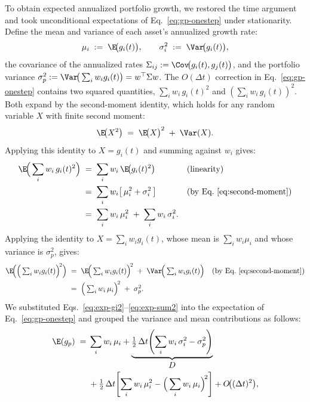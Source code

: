 To obtain expected annualized portfolio growth, we restored the time
argument and took unconditional expectations of
Eq.~\eqref{eq:gp-onestep} under stationarity. Define the mean and
variance of each asset's annualized growth rate:
\begin{equation}
  \mu_i \;:=\; \E\!\big(g_i(t)\big), \qquad
  \sigma_i^2 \;:=\; \Var\!\big(g_i(t)\big),
\end{equation}
the covariance of the annualized rates
$\Sigma_{ij} := \Cov\!\big(g_i(t), g_j(t)\big)$, and the portfolio
variance
$\sigma_p^2 := \Var\!\big(\textstyle\sum_i w_i g_i(t)\big) =
w^\top \Sigma w$. The $O(\Delta t)$ correction in
Eq.~\eqref{eq:gp-onestep} contains two squared quantities,
$\sum_i w_i\, g_i(t)^2$ and $(\sum_i w_i\, g_i(t))^2$. Both expand
by the second-moment identity, which holds for any random variable
$X$ with finite second moment:
\begin{equation}
  \E\!\big(X^2\big) \;=\; \E\!\big(X\big)^2 \;+\; \Var(X).
  \label{eq:second-moment}
\end{equation}
Applying this identity to $X = g_i(t)$ and summing against $w_i$ gives:
\begin{align}
  \E\!\Big(\sum_{i} w_i\, g_i(t)^2\Big)
   &\;=\; \sum_{i} w_i\, \E\!\big(g_i(t)^2\big)
       && \text{(linearity)} \notag \\
   &\;=\; \sum_{i} w_i\!\left[\,\mu_i^2 + \sigma_i^2\,\right]
       && \text{(by Eq.~\eqref{eq:second-moment})} \notag \\
   &\;=\; \sum_{i} w_i\, \mu_i^2 \;+\; \sum_{i} w_i\, \sigma_i^2.
   \label{eq:exp-gi2}
\end{align}
Applying the identity to $X = \sum_i w_i g_i(t)$, whose mean is
$\sum_i w_i\mu_i$ and whose variance is $\sigma_p^2$, gives:
\begin{align}
  \E\!\Big(\Big(\textstyle\sum_{i} w_i g_i(t)\Big)^{\!2}\Big)
   &\;=\; \E\!\Big(\textstyle\sum_{i} w_i g_i(t)\Big)^{\!2}
       \;+\; \Var\!\Big(\textstyle\sum_{i} w_i g_i(t)\Big)
       && \text{(by Eq.~\eqref{eq:second-moment})} \notag \\
   &\;=\; \Big(\textstyle\sum_{i} w_i\, \mu_i\Big)^{\!2}
       \;+\; \sigma_p^2.
   \label{eq:exp-sum2}
\end{align}
We substituted Eqs.~\eqref{eq:exp-gi2}--\eqref{eq:exp-sum2} into the
expectation of Eq.~\eqref{eq:gp-onestep} and grouped the variance and
mean contributions as follows:
\begin{equation}
\begin{aligned}
  \E(g_p) \;={}& \sum_{i} w_i\, \mu_i
  + \underbrace{\tfrac{1}{2}\,\Delta t\!\left(\sum_{i} w_i\, \sigma_i^2
       - \sigma_p^2\right)}_{\displaystyle D} \\
  &+ \tfrac{1}{2}\,\Delta t\!\left[\sum_{i} w_i\, \mu_i^2
       - \Big(\sum_{i} w_i\, \mu_i\Big)^{\!2}\right]
  + O\!\big((\Delta t)^2\big),
\end{aligned}
  \label{eq:booth-fama}
\end{equation}
